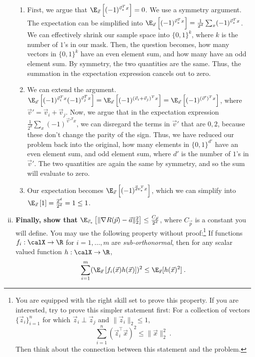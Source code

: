\documentclass[11pt]{article}
\begin{document}
\begin{Parts}
\begin{enumerate}[(i)]
\begin{tcolorbox}[breakable]
	\begin{enumerate}
		\item First, we argue that $\E_{\vec x}\left[(-1)^{\vec v_*^Tx}\right]=0$. We use a symmetry argument. The expectation can be simplified into $\E_{\vec x}\left[(-1)^{\vec v_*^Tx}\right]=\frac{1}{2^d}\sum_{x}(-1)^{\vec v_*^Tx}$. We can effectively shrink our sample space into $\{0,1\}^k$, where $k$ is the number of $1$'s in our mask. Then, the question becomes, how many vectors in $\{0,1\}^k$ have an even element sum, and how many have an odd element sum. By symmetry, the two quantities are the same. Thus, the summation in the expectation expression cancels out to zero.
		\item We can extend the argument. $\E_{\vec x}\left[(-1)^{\vec v_i^Tx}(-1)^{\vec v_j^Tx}\right]=\E_{\vec x}\left[(-1)^{(\vec v_i+\vec v_j)^Tx}\right]=\E_{\vec x}\left[(-1)^{(\vec v')^Tx}\right]$, where $\vec v'=\vec v_i+\vec v_j$. Now, we argue that in the expectation expression $\frac{1}{2^d}\sum_{x}(-1)^{\vec v'^Tx}$, we can disregard the terms in $\vec v'$ that are $0,2$, because these don't change the parity of the sign. Thus, we have reduced our problem back into the original, how many elements in $\{0,1\}^{d'}$ have an even element sum, and odd element sum, where $d'$ is the number of $1$'s in $\vec v'$. The two quantities are again the same by symmetry, and so the sum will evaluate to zero. 
		\item Our expectation becomes $\E_{\vec x}\left[(-1)^{\vec 2v_*^Tx}\right]$, which we can simplify into $\E_{\vec x}\left[1\right]=\frac{2^d}{2^d}=1 \leq 1$.  
	\end{enumerate} 
\end{tcolorbox}

\item {\bf Finally, show that} $\E_{\vec v_*}\left[\|\nabla R(\vec p) - \vec a\|_2^2\right] \leq \frac{C_{\vec p}}{2^d}$, where $C_{\vec p}$ is a constant you will define. You may use the following property without proof:\footnote{
	You are equipped with the right skill set to prove this property.
	If you are interested, try to prove this simpler statement first: For a collection of vectors $\{\vec z_i\}_{i=1}^n$ for which $\vec z_i\perp\vec z_j$ and $\|\vec z_i\|_2\leq 1$,
	\[\sum_{i=1}^n (\vec z_i^\top \vec x)^2 
	\leq \|\vec x\|_2^2\:.\]
	Then think about the connection between this statement and the problem.
} If functions $f_i:\calX\to\R$ for $i=1,\dots,m$ are \emph{sub-orthonormal}, then for any scalar valued function $h:\calX\to\R$,
\[\sum_{i=1}^{m}(\E_{\vec x}\left[f_i(\vec x)h(\vec x)\right])^{2} \leq \E_{\vec x}[h(\vec x)^2]\:.\]


\end{enumerate}
\end{Parts}
\end{document}
